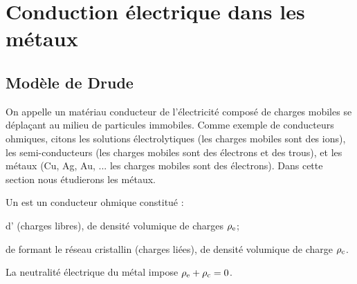 \documentclass[12pt,fancy]{cours}%
\begin{document}


\section{Conduction électrique dans les métaux}

\subsection{Modèle de Drude}

On appelle  un matériau conducteur de l'électricité  composé de charges  mobiles se déplaçant au milieu de particules immobiles. Comme exemple de conducteurs ohmiques, citons les solutions électrolytiques (les charges mobiles sont des ions), les semi-conducteurs (les charges mobiles sont des électrons et des trous), et les métaux (Cu, Ag, Au, ... les charges mobiles sont des électrons). Dans cette section nous étudierons les métaux.

\begin{definition}[Métal]
Un  est un conducteur ohmique constitué :
\begin{liste}
 \item d' (charges libres), de densité volumique de charges $\rho_{\rm{e}}$;
 \item de  formant le réseau cristallin (charges liées), de densité volumique de charge $\rho_{\rm c}$. 
\end{liste}
La neutralité électrique  du métal impose  $\rho_{\rm e}  + \rho_{\rm c} =0$.
 \end{definition}
\end{document}
